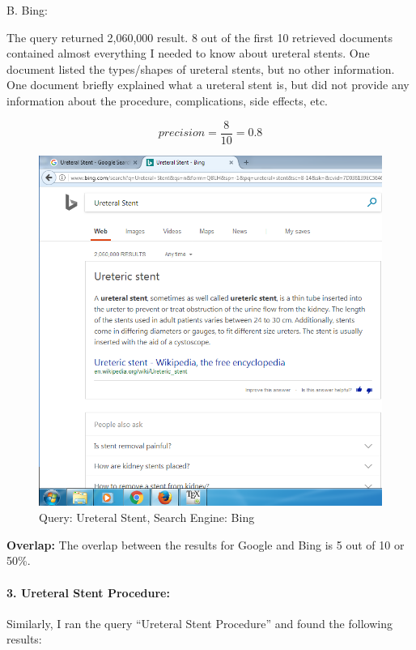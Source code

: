 \documentclass[a4paper, 11pt]{article}
\begin{document}
\pagebreak

B. Bing:

The query returned 2,060,000 result. 8 out of the first 10 retrieved documents contained almost everything I needed to know about ureteral stents. One document listed the types/shapes of ureteral stents, but no other information. One document briefly explained what a ureteral stent is, but did not provide any information about the procedure, complications, side effects, etc.  

$$ 
precision = \frac{8}{10} = 0.8
$$

\begin{figure}[h]
\caption{Query: Ureteral Stent, Search Engine: Bing}
\centering
\includegraphics[scale=0.7]{Q1/ureteral_stent_Bing.png}
\end{figure}

\textbf{Overlap:}
The overlap between the results for Google and Bing is 5 out of 10 or 50\%. 

\paragraph{3. Ureteral Stent Procedure:}


Similarly, I ran the query ``Ureteral Stent Procedure''  and found the following results:
\end{document}
